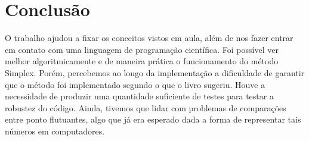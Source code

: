 \documentclass[brazil,times]{abnt}
\begin{document}
\section*{Conclusão}
	O trabalho ajudou a fixar os conceitos vistos em aula, além de nos fazer entrar em contato com uma linguagem de programação científica. Foi possível ver melhor algoritmicamente e de maneira prática o funcionamento do método Simplex. Porém, percebemos ao longo da implementação a dificuldade de garantir que o método foi implementado segundo o que o livro sugeriu. Houve a necessidade de produzir uma quantidade suficiente de testes para testar a robustez do código. Ainda, tivemos que lidar com problemas de comparações entre ponto flutuantes, algo que já era esperado dada a forma de representar tais números em computadores.


\nocite{*}


\end{document}
